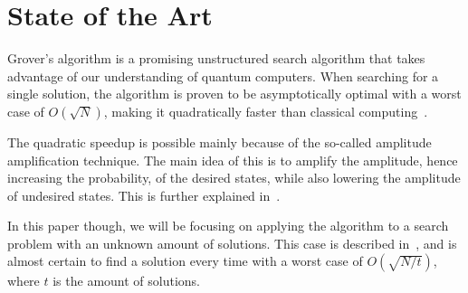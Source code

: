 \section{State of the Art}\label{sec:state-of-the-art}
Grover's algorithm is a promising unstructured search algorithm that takes advantage of our understanding of quantum computers.
When searching for a single solution, the algorithm is proven to be asymptotically optimal with a worst case of $O\left(\sqrt{N}\right)$, making it quadratically faster than classical computing~\cite{Grover}.

The quadratic speedup is possible mainly because of the so-called amplitude amplification technique.
The main idea of this is to amplify the amplitude, hence increasing the probability, of the desired states, while also lowering the amplitude of undesired states.
This is further explained in~\cite{Brassard, Grover}.

In this paper though, we will be focusing on applying the algorithm to a search problem with an unknown amount of solutions.
This case is described in~\cite{Boyer_1998}, and is almost certain to find a solution every time with a worst case of $O\left(\sqrt{N/t}\right)$, where $t$ is the amount of solutions.

